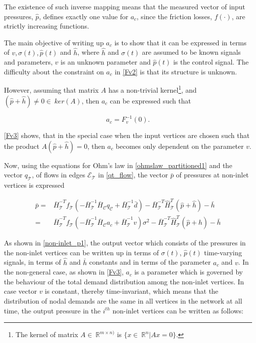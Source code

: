 The existence of such inverse mapping means that the measured vector of input pressures, $\hat{p}$, defines exactly one value for $a_c$, since the friction losses, $f(\cdot)$, are strictly increasing functions.

The main objective of writing up $a_c$ is to show that it can be expressed in terms of $v, \sigma(t), \hat{p}(t)$ and $\hat{h}$, where $\hat{h}$ and $\sigma(t)$ are assumed to be known signals and parameters, $v$ is an unknown parameter and $\hat{p}(t)$ is the control signal. The difficulty about the constraint on $a_c$ in \eqref{Fv2} is that its structure is unknown.  

However, assuming that matrix $A$ has a non-trivial kernel\footnote{The kernel of matrix $A \in \: \mathbb{R}^{m \times n)}$ is $ \{x \in \: \mathbb{R}^{n} | Ax = 0 \} $.}, and $(\hat{p} + \hat{h}) \neq 0 \in \: ker(A)$, then $a_c$ can be expressed such that 

\begin{equation}
\label{Fv3}
a_c = F_v^{-1} (0).
\end{equation}

\eqref{Fv3} shows, that in the special case when the input vertices are chosen such that the product $A(\hat{p} + \hat{h}) = 0$, then $a_c$ becomes only dependent on the parameter $v$. 

Now, using the equations for Ohm's law in \eqref{ohmslaw_partitioned1} and the vector $q_{\mathcal{T}}$, of flows in edges $\mathcal{E}_{\mathcal{T}}$ in \eqref{qt_flow}, the vector $\bar{p}$ of pressures at non-inlet vertices is expressed

\begin{equation}
\begin{split}
  \label{non-inlet_p1}
  \bar{p} = & \bar{H}^{-T}_{\mathcal{T}}f_{\mathcal{T}}(-\bar{H}^{-1}_{\mathcal{T}} \bar{H}_{\mathcal{C}} q_\mathcal{C} + \bar{H}^{-1}_{\mathcal{T}} \bar{d}) - \bar{H}^{-T}_{\mathcal{T}}\hat{H}^{T}_{\mathcal{T}} (\hat{p} + \hat{h}) - \bar{h} \\
  =&\bar{H}^{-T}_{\mathcal{T}}f_{\mathcal{T}}(-\bar{H}^{-1}_{\mathcal{T}} \bar{H}_{\mathcal{C}} a_c + \bar{H}^{-1}_{\mathcal{T}} v)\sigma^2 - \bar{H}^{-T}_{\mathcal{T}}\hat{H}^{T}_{\mathcal{T}} (\hat{p} + \hat{h}) - \bar{h}
\end{split}
\end{equation}

As shown in \eqref{non-inlet_p1}, the output vector which consists of the pressures in the non-inlet vertices can be written up in terms of $\sigma(t)$, $\hat{p}(t)$ time-varying signals, in terms of $\hat{h}$ and $\bar{h}$ constants and in terms of the parameter $a_c$ and $v$. In the non-general case, as shown in \eqref{Fv3}, $a_c$ is a parameter which is governed by the behaviour of the total demand distribution among the non-inlet vertices. In case vector $v$ is constant, thereby time-invariant, which means that the distribution of nodal demands are the same in all vertices in the network at all time, the output pressure in the $i^{th}$ non-inlet vertices can be written as follows: 

